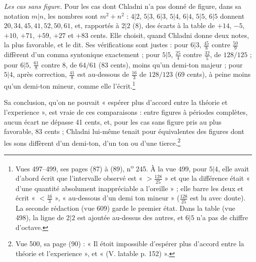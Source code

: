 \documentclass[11pt,a4paper]{article}
\begin{document}
\emph{Les cas sans figure.} Pour les cas dont Chladni n'a pas donné de figure,
dans sa notation $m|n$, les nombres sont $m^2+n^2$ : $4|2$, $5|3$, $6|3$, $5|4$,
$6|4$, $5|5$, $6|5$ donnent $20, 34, 45, 41, 52, 50, 61$, et, rapportés à $2|2$
(8), des écarts à la table de $+14$, $-5$, $+10$, $+71$, $+59$, $+27$ et $+83$
cents. Elle choisit, quand Chladni donne deux notes, la plus favorable, et le dit.
Ses vérifications sont justes : pour $6|3$, $\frac{45}{8}$ contre $\frac{50}{9}$
diffèrent d'un comma syntonique exactement ; pour $5|5$, $\frac{25}{4}$ contre
$\frac{32}{5}$, de $128/125$ ; pour $6|5$, $\frac{61}{8}$ contre $8$, de $64/61$
(83 cents), moins qu'un demi-ton majeur ; pour $5|4$, après correction,
$\frac{41}{8}$ est au-dessous de $\frac{16}{3}$ de $128/123$ (69 cents), à
peine moins qu'un demi-ton mineur, comme elle l'écrit.\footnote{Vues 497--499,
ses pages (87) à (89), n\textsuperscript{o} 245. À la vue 499, pour $5|4$, elle
avait d'abord écrit que l'intervalle observé est « $> \frac{128}{25}$ » et que la
différence était « d'une quantité absolument inappréciable a l'oreille » ; elle
barre les deux et écrit « $<\frac{16}{3}$ », « au-dessous d'un demi ton
mineur » ($\frac{128}{25}$ est lu avec doute). La seconde rédaction (vue 609)
garde le premier état. Dans la table (vue 498), la ligne de $2|2$ est ajoutée
au-dessus des autres, et $6|5$ n'a pas de chiffre d'octave.}

Sa conclusion, qu'on ne pouvait « espérer plus d'accord entre la théorie et
l'experience », est vraie de ces comparaisons : entre figures à périodes
complètes, aucun écart ne dépasse 41 cents, et, pour les cas sans figure pris
au plus favorable, 83 cents ; Chladni lui-même tenait pour équivalentes des
figures dont les sons diffèrent d'un demi-ton, d'un ton ou d'une
tierce.\footnote{Vue 500, sa page (90) : « Il étoit impossible d'espérer plus
d'accord entre la théorie et l'experience », et « (V. latable p. 152) ».}
\end{document}
